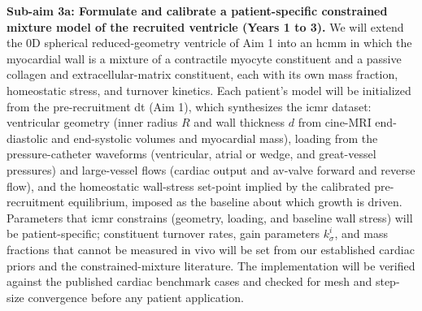 \textbf{Sub-aim 3a: Formulate and calibrate a patient-specific constrained mixture model of the recruited ventricle (Years 1 to 3).} We will extend the 0D spherical reduced-geometry ventricle of Aim 1 into an \gls*{hcmm} in which the myocardial wall is a mixture of a contractile myocyte constituent and a passive collagen and extracellular-matrix constituent, each with its own mass fraction, homeostatic stress, and turnover kinetics. Each patient's model will be initialized from the pre-recruitment \gls*{dt} (Aim 1), which synthesizes the \gls*{icmr} dataset: ventricular geometry (inner radius $R$ and wall thickness $d$ from cine-MRI end-diastolic and end-systolic volumes and myocardial mass), loading from the pressure-catheter waveforms (ventricular, atrial or wedge, and great-vessel pressures) and large-vessel flows (cardiac output and \gls*{av}-valve forward and reverse flow), and the homeostatic wall-stress set-point implied by the calibrated pre-recruitment equilibrium, imposed as the baseline about which growth is driven. Parameters that \gls*{icmr} constrains (geometry, loading, and baseline wall stress) will be patient-specific; constituent turnover rates, gain parameters $k^i_\sigma$, and mass fractions that cannot be measured in vivo will be set from our established cardiac priors\cite{gebauer23} and the constrained-mixture literature. The implementation will be verified against the published cardiac benchmark cases\cite{arostica25} and checked for mesh and step-size convergence before any patient application.

